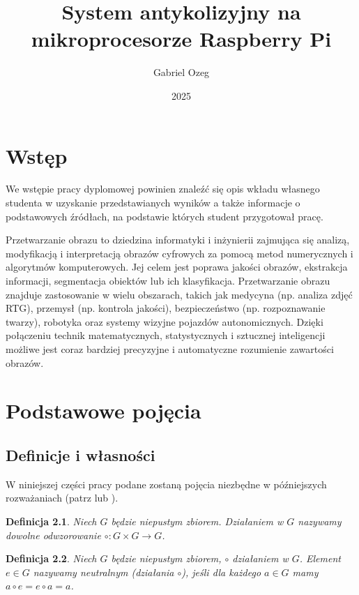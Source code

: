 \documentclass[magisterska]{pracadypl}
\author{Gabriel Ozeg}
\title{System antykolizyjny na mikroprocesorze Raspberry Pi}
\date{2025}
\newtheorem{defi}{Definicja}[section]
\begin{document}
\maketitle
\tableofcontents
\newpage



\chapter{Wstęp}

We wstępie pracy dyplomowej powinien znaleźć się opis wkładu własnego studenta w uzyskanie przedstawianych wyników a także informacje o podstawowych źródłach, na podstawie których student przygotował pracę.

Przetwarzanie obrazu to dziedzina informatyki i inżynierii zajmująca się analizą, modyfikacją i interpretacją obrazów cyfrowych za pomocą metod numerycznych i algorytmów komputerowych. Jej celem jest poprawa jakości obrazów, ekstrakcja informacji, segmentacja obiektów lub ich klasyfikacja. Przetwarzanie obrazu znajduje zastosowanie w wielu obszarach, takich jak medycyna (np. analiza zdjęć RTG), przemysł (np. kontrola jakości), bezpieczeństwo (np. rozpoznawanie twarzy), robotyka oraz systemy wizyjne pojazdów autonomicznych. Dzięki połączeniu technik matematycznych, statystycznych i sztucznej inteligencji możliwe jest coraz bardziej precyzyjne i automatyczne rozumienie zawartości obrazów.


\chapter{Podstawowe pojęcia}

  \section{Definicje i własności}

  W niniejszej części pracy podane zostaną pojęcia niezbędne w późniejszych rozważaniach (patrz \cite{Kostrykin} lub \cite{Lang}).
  \begin{defi}
  Niech $G$ będzie niepustym zbiorem. Działaniem w $G$ nazywamy dowolne odwzorowanie $\circ:G\times G\to G$.
  \end{defi}

  \begin{defi}
  Niech $G$ będzie niepustym zbiorem, $\circ$ działaniem w $G$. Element $e\in G$ nazywamy neutralnym (działania $\circ$), jeśli dla każdego $a\in G$ mamy $a\circ e=e\circ a=a$.
  \end{defi}
\end{document}
